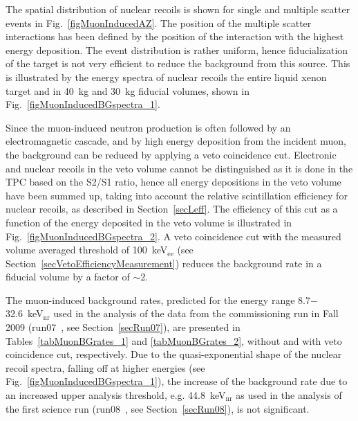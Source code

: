 The spatial distribution of nuclear recoils is shown for single and multiple scatter events in Fig.~\ref{figMuonInducedAZ}. The position of the multiple scatter interactions has been defined by the position of the interaction with the highest energy deposition. The event distribution is rather uniform, hence fiducialization of the target is not very efficient to reduce the background from this source. This is illustrated by the energy spectra of nuclear recoils the entire liquid xenon target and in 40~kg and 30~kg fiducial volumes, shown in Fig.~\ref{figMuonInducedBGspectra_1}. 

Since the muon-induced neutron production is often followed by an electromagnetic cascade, and by high energy deposition from the incident muon, the background can be reduced by applying a veto coincidence cut. Electronic and nuclear recoils in the veto volume cannot be distinguished as it is done in the TPC based on the S2/S1 ratio, hence all energy depositions in the veto volume have been summed up, taking into account the relative scintillation efficiency for nuclear recoils, as described in Section~\ref{secLeff}. The efficiency of this cut as a function of the energy deposited in the veto volume is illustrated in Fig.~\ref{figMuonInducedBGspectra_2}. A veto coincidence cut with the measured volume averaged threshold of 100~keV$_{\mathrm{ee}}$ (see Section~\ref{secVetoEfficiencyMeasurement}) reduces the background rate in a fiducial volume by a factor of $\sim$2. 

The muon-induced background rates, predicted for the energy range 8.7$-$32.6~keV$_{\mathrm{nr}}$ used in the analysis of the data from the commissioning run in Fall 2009 (run07~\cite{xe100-run07}, see Section~\ref{secRun07}), are presented in Tables~\ref{tabMuonBGrates_1} and \ref{tabMuonBGrates_2}, without and with veto coincidence cut, respectively. Due to the quasi-exponential shape of the nuclear recoil spectra, falling off at higher energies (see Fig.~\ref{figMuonInducedBGspectra_1}), the increase of the background rate due to an increased upper analysis threshold, e.g. 44.8~keV$_{\mathrm{nr}}$ as used in the analysis of the first science run (run08~\cite{xe100-run08}, see Section~\ref{secRun08}), is not significant.


